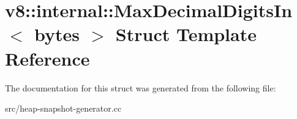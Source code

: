 \hypertarget{structv8_1_1internal_1_1_max_decimal_digits_in}{}\section{v8\+:\+:internal\+:\+:Max\+Decimal\+Digits\+In$<$ bytes $>$ Struct Template Reference}
\label{structv8_1_1internal_1_1_max_decimal_digits_in}


The documentation for this struct was generated from the following file\+:\begin{DoxyCompactItemize}
\item 
src/heap-\/snapshot-\/generator.\+cc\end{DoxyCompactItemize}
